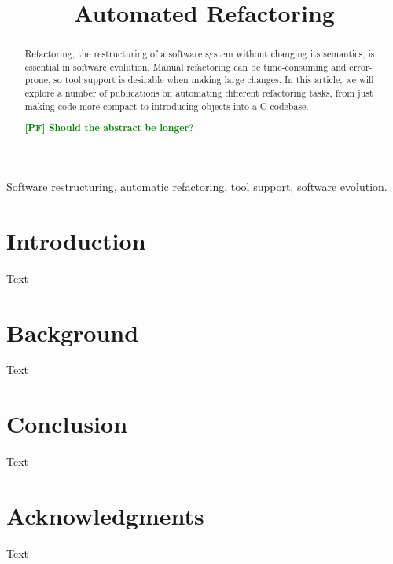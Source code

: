 \documentclass[journal]{IEEEtran}
\newcommand{\pf}[1]{\textcolor{green}{\textbf{[PF] #1}}}
\begin{document}
\title{Automated Refactoring}


\author{


}


\maketitle


\begin{abstract}
Refactoring, the restructuring of a software system without changing its semantics, is essential in software evolution. 
Manual refactoring can be time-consuming and error-prone, so tool support is desirable when making large changes. In 
this article, we will explore a number of publications on automating different refactoring tasks, from just making code 
more compact to introducing objects into a C codebase.

\pf{Should the abstract be longer?}
\end{abstract}

\begin{IEEEkeywords}
Software restructuring, automatic refactoring, tool support, software evolution.
\end{IEEEkeywords}

%
\IEEEpeerreviewmaketitle


\section{Introduction}

Text \cite{polymorphism}

\section{Background}

Text

\section{Conclusion}

Text

\section*{Acknowledgments}

Text




\balance

\end{document}
